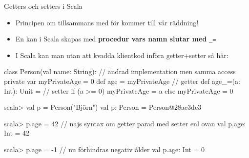 \begin{Slide}{Getters och setters i Scala}\SlideFontSmall
\setlength{\leftmargini}{0pt}
\begin{itemize}
\item Principen om  tillsammans med  för  kommer till vår räddning!

\item
En  kan i Scala skapas med \textbf{procedur vars namn slutar med} \texttt{\_=}
\pause
\item I Scala kan man utan att kvadda klientkod införa getter+setter så här:
\end{itemize}
\begin{Code}
class Person(val name: String): // ändrad implementation men samma access
  private var myPrivateAge = 0
  def age = myPrivateAge         // getter
  def age_=(a: Int): Unit =      // setter
    if (a >= 0) myPrivateAge = a else myPrivateAge = 0
\end{Code}
\pause\vspace{-0.5em}
\begin{REPL}
scala> val p = Person("Björn")
val p: Person = Person@28ac3dc3

scala> p.age = 42      // najs syntax om getter parad med setter enl ovan
val p.age: Int = 42

scala> p.age = -1      // nu förhindras negativ ålder
val p.age: Int = 0
\end{REPL}
\end{Slide}


